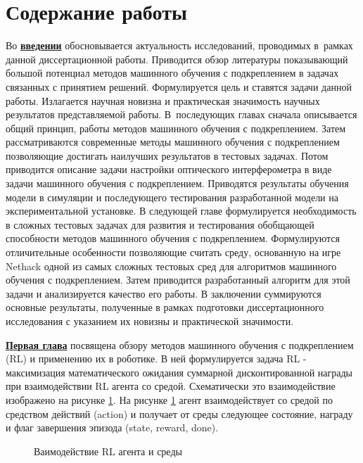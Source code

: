 \section*{Содержание работы}
Во \underline{\textbf{введении}} обосновывается актуальность
исследований, проводимых в~рамках данной диссертационной работы. Приводится обзор литературы показывающий большой потенциал методов машинного обучения с подкреплением в задачах связанных с принятием решений. Формулируется цель и ставятся задачи данной работы. Излагается научная новизна
и практическая значимость научных результатов представляемой работы. 
В~последующих главах сначала описывается общий принцип, работы методов машинного обучения с подкреплением. Затем рассматриваются современные методы машинного обучения с подкреплением позволяющие достигать наилучших результатов в тестовых задачах. Потом приводится описание задачи настройки оптического интерферометра в виде задачи машинного обучения с подкреплением. Приводятся результаты обучения модели в симуляции и последующего тестирования разработанной модели на экспериментальной установке. В следующей главе формулируется необходимость в сложных тестовых задачах для развития и тестирования обобщающей способности методов машинного обучения с подкреплением. Формулируются отличительные особенности позволяющие считать среду, основанную на игре Nethack одной из самых сложных тестовых сред для алгоритмов машинного обучения с подкреплением. Затем приводится разработанный алгоритм для этой задачи и анализируется качество его работы. В заключении суммируются основные результаты, полученные в рамках подготовки диссертационного исследования с указанием их новизны и практической значимости. 


\underline{\textbf{Первая глава}} посвящена обзору методов машинного обучения с подкреплением (RL) и применению их в роботике. В ней формулируется задача RL - максимизация математического ожидания суммарной дисконтированной награды при взаимодействии RL агента со средой. Схематически это взаимодействие изображено на рисунке \ref{fig:rl_setting}. На рисунке \ref{fig:rl_setting} агент взаимодействует со средой по средством действий (action) и получает от среды следующее состояние, награду и флаг завершения эпизода (state, reward, done).

\begin{figure}[ht]
    \caption{Ваимодействие RL агента и среды}\label{fig:rl_setting}
\end{figure}

